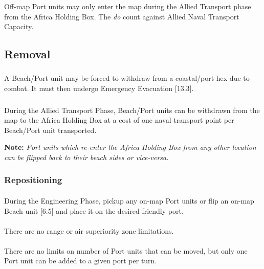 \subsubsection{}
Off-map Port units may only enter the map during the Allied Transport phase from the Africa Holding Box. The \textit{do} count against Allied Naval Transport Capacity.

\subsection{Removal}

\subsubsection{}
A Beach/Port unit may be forced to withdraw from a coastal/port hex due to combat. It must then undergo Emergency Evacuation [13.3].

\subsubsection{}
During the Allied Transport Phase, Beach/Port units can be withdrawn from the map to the Africa Holding Box at a cost of one naval transport point per Beach/Port unit transported.

\textbf{Note:} \textit{Port units which re-enter the Africa Holding Box from any other location can be flipped back to their beach sides or vice-versa.}

\subsubsection{Repositioning}

\paragraph{}
During the Engineering Phase, pickup any on-map Port units or flip an on-map Beach unit [6.5] and place it on the desired friendly port.

\paragraph{}
There are no range or air superiority zone limitations.

\paragraph{}
There are no limits on number of Port units that can be moved, but only one Port unit can be added to a given port per turn.


